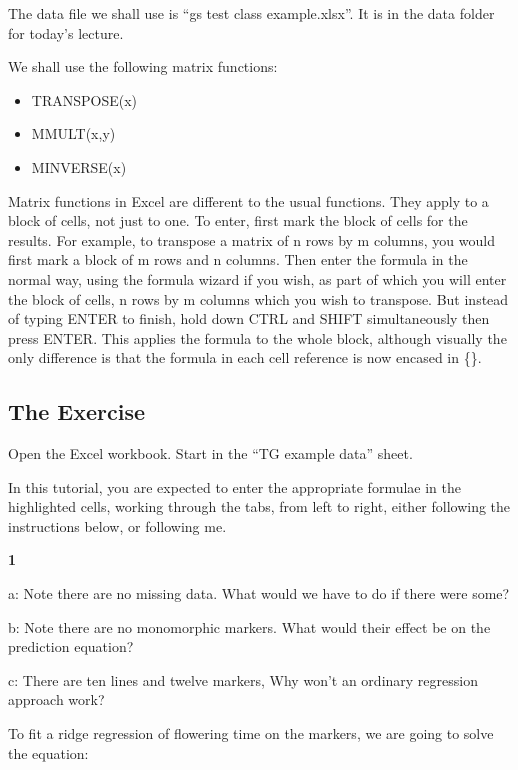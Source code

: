 \documentclass[
]{book}
\makeatletter
\providecommand{\tightlist}{%
  \setlength{\itemsep}{0pt}\setlength{\parskip}{0pt}}
\newenvironment{kframe}{%
\medskip{}
\setlength{\fboxsep}{.8em}
 \def\at@end@of@kframe{}%
 \ifinner\ifhmode%
  \def\at@end@of@kframe{\end{minipage}}%
  \begin{minipage}{\columnwidth}%
 \fi\fi%
 \def\FrameCommand##1{\hskip\@totalleftmargin \hskip-\fboxsep
 \colorbox{shadecolor}{##1}\hskip-\fboxsep
     \hskip-\linewidth \hskip-\@totalleftmargin \hskip\columnwidth}%
 \MakeFramed {\advance\hsize-\width
   \@totalleftmargin\z@ \linewidth\hsize
   \@setminipage}}%
 {\par\unskip\endMakeFramed%
 \at@end@of@kframe}
\newenvironment{rmdblock}[1]
  {
  \begin{itemize}
  \renewcommand{\labelitemi}{
    \raisebox{-.7\height}[0pt][0pt]{
      {\setkeys{Gin}{width=3em,keepaspectratio}\texttt{[image: images/\#1]}}
    }
  }
  \setlength{\fboxsep}{1em}
  \begin{kframe}
  \item
  }
  {
  \end{kframe}
  \end{itemize}
  }
\newenvironment{rmdquiz}
  {\begin{rmdblock}{quiz}}
  {\end{rmdblock}}
\makeatother
\begin{document}
The data file we shall use is ``gs test class example.xlsx''. It is in the data folder for today's lecture.

We shall use the following matrix functions:

\begin{itemize}
\tightlist
\item
  TRANSPOSE(x)
\item
  MMULT(x,y)
\item
  MINVERSE(x)
\end{itemize}

Matrix functions in Excel are different to the usual functions. They apply to a block of cells, not just to one. To enter, first mark the block of cells for the results. For example, to transpose a matrix of n rows by m columns, you would first mark a block of m rows and n columns. Then enter the formula in the normal way, using the formula wizard if you wish, as part of which you will enter the block of cells, n rows by m columns which you wish to transpose. But instead of typing ENTER to finish, hold down CTRL and SHIFT simultaneously then press ENTER. This applies the formula to the whole block, although visually the only difference is that the formula in each cell reference is now encased in \{\}.

\hypertarget{the-exercise-4}{%
\subsection{The Exercise}\label{the-exercise-4}}

Open the Excel workbook. Start in the ``TG example data'' sheet.

In this tutorial, you are expected to enter the appropriate formulae in the highlighted cells, working through the tabs, from left to right, either following the instructions below, or following me.

\begin{rmdquiz}
\textbf{1}

a: Note there are no missing data. What would we have to do if there were some?

b: Note there are no monomorphic markers. What would their effect be on the prediction equation?

c: There are ten lines and twelve markers, Why won't an ordinary regression approach work?
\end{rmdquiz}

To fit a ridge regression of flowering time on the markers, we are going to solve the equation:
\end{document}
